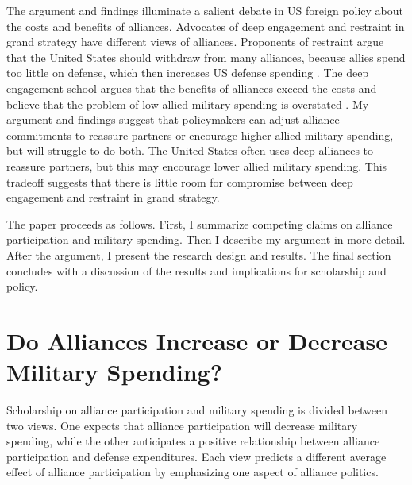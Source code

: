 \documentclass[12pt]{article}
\begin{document}
The argument and findings illuminate a salient debate in US foreign policy about the costs and benefits of alliances. 
Advocates of deep engagement \citep{Brooksetal2013} and restraint \citep{Posen2014} in grand strategy have different views of alliances. 
Proponents of restraint argue that the United States should withdraw from many alliances, because allies spend too little on defense, which then increases US defense spending \citep{Preble2009}.
The deep engagement school argues that the benefits of alliances exceed the costs and believe that the problem of low allied military spending is overstated \citep{BrandsFeaver2017}. 
My argument and findings suggest that policymakers can adjust alliance commitments to reassure partners or encourage higher allied military spending, but will struggle to do both. 
The United States often uses deep alliances to reassure partners, but this may encourage lower allied military spending. 
This tradeoff suggests that there is little room for compromise between deep engagement and restraint in grand strategy.  


The paper proceeds as follows. 
First, I summarize competing claims on alliance participation and military spending. 
Then I describe my argument in more detail. 
After the argument, I present the research design and results. 
The final section concludes with a discussion of the results and implications for scholarship and policy.  



\section{Do Alliances Increase or Decrease Military Spending?}


Scholarship on alliance participation and military spending is divided between two views.
One expects that alliance participation will decrease military spending, while the other anticipates a positive relationship between alliance participation and defense expenditures. 
Each view predicts a different average effect of alliance participation by emphasizing one aspect of alliance politics.   
\end{document}
